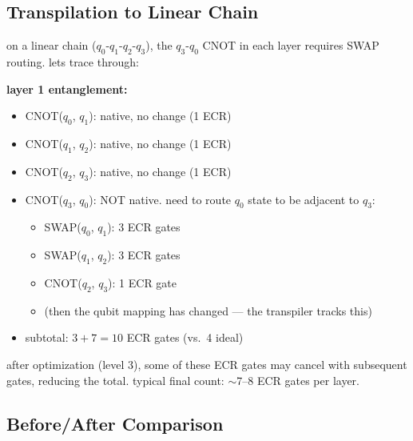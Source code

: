 \documentclass[11pt,a4paper]{article}
\theoremstyle{definition}
\theoremstyle{remark}
\begin{document}
\subsection{Transpilation to Linear Chain}

on a linear chain ($q_0$-$q_1$-$q_2$-$q_3$), the $q_3$-$q_0$ CNOT in each layer requires SWAP routing. lets trace through:

\textbf{layer 1 entanglement:}
\begin{itemize}[leftmargin=*]
    \item CNOT($q_0$, $q_1$): native, no change (1 ECR)
    \item CNOT($q_1$, $q_2$): native, no change (1 ECR)
    \item CNOT($q_2$, $q_3$): native, no change (1 ECR)
    \item CNOT($q_3$, $q_0$): NOT native. need to route $q_0$ state to be adjacent to $q_3$:
    \begin{itemize}
        \item SWAP($q_0$, $q_1$): 3 ECR gates
        \item SWAP($q_1$, $q_2$): 3 ECR gates
        \item CNOT($q_2$, $q_3$): 1 ECR gate
        \item (then the qubit mapping has changed --- the transpiler tracks this)
    \end{itemize}
    \item subtotal: $3 + 7 = 10$ ECR gates (vs.\ 4 ideal)
\end{itemize}

after optimization (level 3), some of these ECR gates may cancel with subsequent gates, reducing the total. typical final count: $\sim$7--8 ECR gates per layer.

\subsection{Before/After Comparison}
\end{document}
